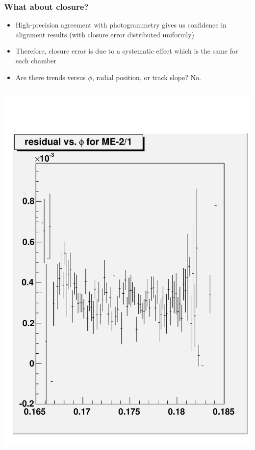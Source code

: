 \documentclass[compress]{beamer}
\begin{document}
\begin{frame}
\frametitle{What about closure?}
\begin{itemize}
\item High-precision agreement with photogrammetry gives us confidence in alignment results (with closure error distributed uniformly)
\item Therefore, closure error is due to a systematic effect which is the same for each chamber
\item Are there trends versus $\phi$, radial position, or track slope?  No.
\end{itemize}

\vfill
\begin{columns}
\includegraphics[width=\linewidth]{residual_vsphi.pdf}

\end{columns}
\end{frame}
\end{document}
